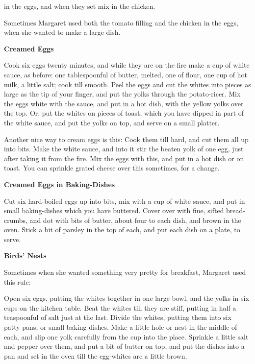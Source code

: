 \documentclass[11pt]{book}
\newcommand{\indpar}{\par\noindent\hspace*{\parindent}}
\newcommand{\instruction}{\indpar}
\newenvironment{RecipeTitle}{\medskip\begin{center}\large\bf }{\end{center}\smallskip}
\begin{document}
in the eggs, and when they set mix in the chicken.
\instruction
  Sometimes Margaret used both the tomato filling and the chicken in the
eggs, when she wanted to make a large dish.
\begin{RecipeTitle}
Creamed Eggs\label{creamed_eggs}
\end{RecipeTitle}
\instruction
  Cook six eggs twenty minutes, and while they are on the fire make a
cup of white sauce, as before: one tablespoonful of butter, melted,
one of flour, one cup of hot milk, a little salt; cook till smooth.
Peel the eggs and cut the whites into pieces as large as the tip of your
finger, and put the yolks through the potato-ricer.  Mix the eggs white
with the sauce, and put in a hot dish, with the yellow yolks over the
top.  Or, put the whites on pieces of toast, which you have dipped in
part of the white sauce, and put the yolks on top, and serve on a small
platter.
\instruction
  Another nice way to cream eggs is this:  Cook them till hard, and cut
them all up into bits.  Make the white sauce, and into it stir the
beaten yolk of one egg, just after taking it from the fire.  Mix the
eggs with this, and put in a hot dish or on toast.  You can sprinkle
grated cheese over this sometimes, for a change.
\begin{RecipeTitle}
Creamed Eggs in Baking-Dishes\label{creamed_eggs_in_baking_dishes}
\end{RecipeTitle}
\instruction
  Cut six hard-boiled eggs up into bits, mix with a cup of white sauce,
and put in small baking-dishes which you have buttered.  Cover over
with fine, sifted bread-crumbs, and dot with bits of butter, about
four to each dish, and brown in the oven.  Stick a bit of parsley in
the top of each, and put each dish on a plate, to serve.
\begin{RecipeTitle}
Birds' Nests\label{birds_nests}
\end{RecipeTitle}
\instruction
  Sometimes when she wanted something very pretty for breakfast,
Margaret used this rule:
\instruction
  Open six eggs, putting the whites together in one large bowl, and
the yolks in six cups on the kitchen table.  Beat the whites till they
are stiff, putting in half a teaspoonful of salt just at the last.
Divide the whites, putting them into six patty-pans, or small
baking-dishes.  Make a little hole or nest in the middle of each,
and slip one yolk carefully from the cup into the place.  Sprinkle a
little salt and pepper over them, and put a bit of butter on top,
and put the dishes into a pan and set in the oven till the egg-whites
are a little brown.
\end{document}
